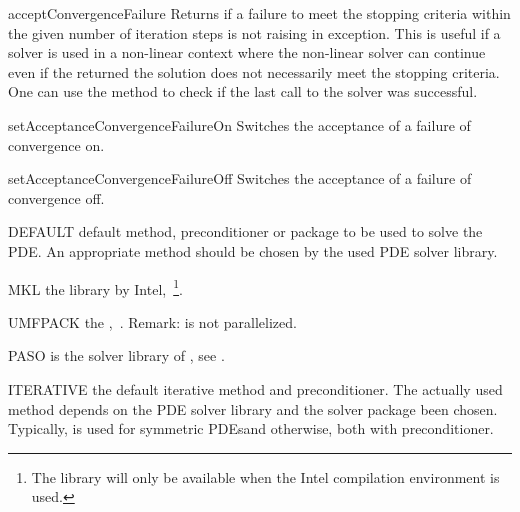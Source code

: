 \begin{methoddesc}[SolverOptions]{acceptConvergenceFailure}{}
Returns \True if a failure to meet the stopping criteria within the
given number of iteration steps is not raising in exception. This is useful 
if a solver is used in a non-linear context where the non-linear solver can 
continue even if the returned the solution does not necessarily meet the
stopping criteria. One can use the  method to check if the
last call to the solver was successful.
\end{methoddesc}

\begin{methoddesc}[SolverOptions]{setAcceptanceConvergenceFailureOn}{}
Switches the acceptance of a failure of convergence on.  
\end{methoddesc}

\begin{methoddesc}[SolverOptions]{setAcceptanceConvergenceFailureOff}{}
Switches the acceptance of a failure of convergence off.
\end{methoddesc}
    
\begin{memberdesc}[SolverOptions]{DEFAULT}
default method, preconditioner or package to be used to solve the PDE. An appropriate method should be
chosen by the used PDE solver library.
\end{memberdesc}

\begin{memberdesc}[SolverOptions]{MKL}
the \MKL library by Intel,~\footnote{The \MKL library will only be available when the Intel compilation environment is used.}.
\end{memberdesc}

\begin{memberdesc}[SolverOptions]{UMFPACK}
the \UMFPACK,~. Remark: \UMFPACK is not parallelized.
\end{memberdesc}

\begin{memberdesc}[SolverOptions]{PASO}
\PASO is the solver library of \finley, see .
\end{memberdesc}

\begin{memberdesc}[SolverOptions]{ITERATIVE}
the default iterative method and preconditioner. The actually used method depends on the PDE solver library and the solver package been chosen. Typically, \PCG is used for symmetric PDEsand \BiCGStab otherwise, both with \JACOBI preconditioner.
\end{memberdesc}

